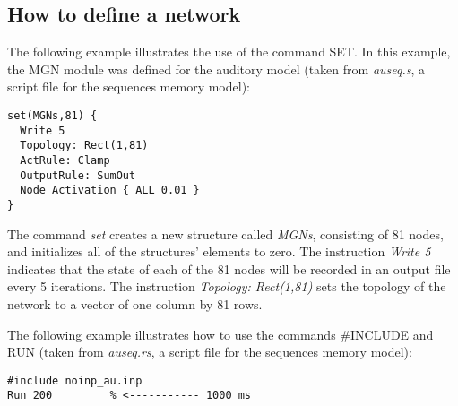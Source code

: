 \documentclass[12pt]{article}
\begin{document}
\subsection{How to define a network}
The following example illustrates the use of the command SET. In this
example, the MGN module was defined for
the auditory model (taken from {\em auseq.s}, a script file for the
sequences memory model):
\begin{verbatim} 
set(MGNs,81) {
  Write 5
  Topology: Rect(1,81)
  ActRule: Clamp
  OutputRule: SumOut
  Node Activation { ALL 0.01 }
}
\end{verbatim}
The command {\em set} creates a new structure called {\em MGNs}, 
consisting of 81 nodes, and initializes all of the structures'
elements to zero. The instruction {\em Write 5} indicates that the
state of each of the 81 nodes will be recorded in an output file every
5 iterations. The instruction {\em Topology: Rect(1,81)} sets the 
topology of the network to a vector of one column by 81 rows.

The following example illustrates how to use the commands \#INCLUDE
and RUN (taken from {\em auseq.rs}, a script file for the sequences
memory model):
\begin{verbatim}
#include noinp_au.inp
Run 200 		% <----------- 1000 ms
\end{verbatim}
\end{document}
